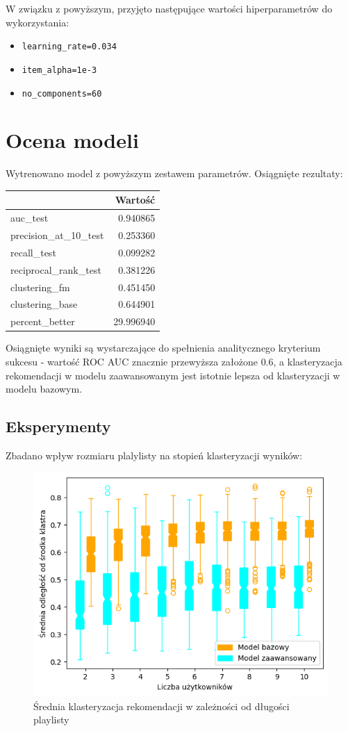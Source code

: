 \documentclass[10pt,a4paper]{article}
\begin{document}
W związku z powyższym, przyjęto następujące wartości hiperparametrów do wykorzystania:

\begin{itemize}
    \item \texttt{learning\_rate=0.034}
    \item \texttt{item\_alpha=1e-3}
    \item \texttt{no\_components=60}
\end{itemize}

\section{Ocena modeli}
Wytrenowano model z powyższym zestawem parametrów. Osiągnięte rezultaty:

\begin{center}
    \begin{tabular}{lr}
\toprule
 & Wartość \\
\midrule
auc\_test & 0.940865 \\
precision\_at\_10\_test & 0.253360 \\
recall\_test & 0.099282 \\
reciprocal\_rank\_test & 0.381226 \\
clustering\_fm & 0.451450 \\
clustering\_base & 0.644901 \\
percent\_better & 29.996940 \\
\bottomrule
\end{tabular}
\end{center}

Osiągnięte wyniki są wystarczające do spełnienia analitycznego kryterium sukcesu - wartość ROC AUC znacznie przewyższa założone $0.6$, a klasteryzacja rekomendacji w modelu zaawansowanym jest istotnie lepsza od klasteryzacji w modelu bazowym.


\subsection*{Eksperymenty}

Zbadano wpływ rozmiaru plalylisty na stopień klasteryzacji wyników:

\begin{figure}[H]
    \centering
    \includegraphics[width=0.5\linewidth]{image_2024-01-20_005257648.png}
    \caption{Średnia klasteryzacja rekomendacji w zależności od długości playlisty}
    \label{fig:enter-label}
\end{figure}
\end{document}
